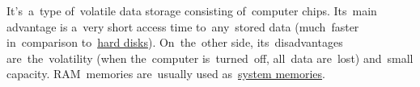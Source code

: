 \label{ram}
It's~a~type of~volatile data storage consisting of~computer chips. Its~main advantage is a~very short access time to~any~stored data (much~faster in~comparison to~\hyperref[harddiskdrive]{hard disks}). On~the~other side, its~disadvantages are~the~volatility (when the~computer is~turned~off, all~data are~lost) and~small capacity. RAM~memories are~usually used as~\hyperref[systemmemory]{system memories}.
